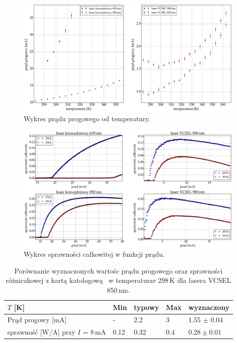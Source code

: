 \begin{figure}[H]
\center
  \includegraphics[scale=0.30]{plot_common/plot_temp_i_th.eps}
  \caption{Wykres prądu progowego od temperatury.}
  \label{fig:plot_temp_i_th}
\end{figure}
\begin{figure}[H]
\center
  \includegraphics[scale=0.30]{plot_common/plot_wall_eff.eps}
  \caption{Wykres sprawności całkowitej w funkcji prądu.}
  \label{fig:plot_wall_eff}
\end{figure}
\newpage
\begin{table}[H]
\begin{center}
\label{tab:tabela1}
\caption{Porównanie wyznaczonych wartośc  prądu progowego oraz sprawności różniczkowej z kartą katologową~\cite{spec_vcsel_850}
 w temperaturze 298\,K dla lasera VCSEL 850\,nm. }
\begin{tabular}{ | C{3.5cm}|  C{1.5cm} | C{1.5cm} | C{1.5cm}| C{3.5cm}|}
\hline
$T$ [K]           &   Min  & typowy & Max   & wyznaczony        \\ \hline
Prąd progowy [mA] &  -    &  2.2    & 3    & 1.55 $\pm$ 0.04  \\ \hline
sprawność [W/A]  przy $I$ = 8\,mA   &  0.12   &  0.32   & 0.4   & $0.28\pm 0.01$      \\ \hline
\end{tabular}
\end{center}
\end{table}

